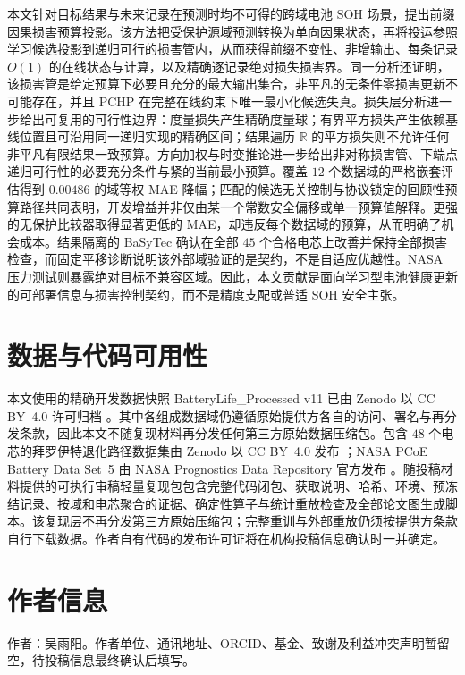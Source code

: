 \documentclass[UTF8,11pt]{ctexart}
\newcommand{\R}{\mathbb{R}}
\begin{document}
本文针对目标结果与未来记录在预测时均不可得的跨域电池 SOH 场景，提出前缀因果损害预算投影。该方法把受保护源域预测转换为单向因果状态，再将投运参照学习候选投影到递归可行的损害管内，从而获得前缀不变性、非增输出、每条记录 $O(1)$ 的在线状态与计算，以及精确逐记录绝对损失损害界。同一分析还证明，该损害管是给定预算下必要且充分的最大输出集合，非平凡的无条件零损害更新不可能存在，并且 PCHP 在完整在线约束下唯一最小化候选失真。损失层分析进一步给出可复用的可行性边界：度量损失产生精确度量球；有界平方损失产生依赖基线位置且可沿用同一递归实现的精确区间；结果遍历 $\R$ 的平方损失则不允许任何非平凡有限结果一致预算。方向加权与时变推论进一步给出非对称损害管、下端点递归可行性的必要充分条件与紧的当前最小预算。覆盖 $12$ 个数据域的严格嵌套评估得到 $0.00486$ 的域等权 MAE 降幅；匹配的候选无关控制与协议锁定的回顾性预算路径共同表明，开发增益并非仅由某一个常数安全偏移或单一预算值解释。更强的无保护比较器取得显著更低的 MAE，却违反每个数据域的预算，从而明确了机会成本。结果隔离的 BaSyTec 确认在全部 $45$ 个合格电芯上改善并保持全部损害检查，而固定平移诊断说明该外部域验证的是契约，不是自适应优越性。NASA 压力测试则暴露绝对目标不兼容区域。因此，本文贡献是面向学习型电池健康更新的可部署信息与损害控制契约，而不是精度支配或普适 SOH 安全主张。

\section*{数据与代码可用性}

本文使用的精确开发数据快照 BatteryLife\_Processed v11 已由 Zenodo 以 CC BY~4.0 许可归档 \citep{batterylife2026processed}。其中各组成数据域仍遵循原始提供方各自的访问、署名与再分发条款，因此本文不随复现材料再分发任何第三方原始数据压缩包。包含 $48$ 个电芯的拜罗伊特退化路径数据集由 Zenodo 以 CC BY~4.0 发布 \citep{roder2025degradationdata}；NASA PCoE Battery Data Set~5 由 NASA Prognostics Data Repository 官方发布 \citep{saha2007nasa}。随投稿材料提供的可执行审稿轻量复现包包含完整代码闭包、获取说明、哈希、环境、预冻结记录、按域和电芯聚合的证据、确定性算子与统计重放检查及全部论文图生成脚本。该复现层不再分发第三方原始压缩包；完整重训与外部重放仍须按提供方条款自行下载数据。作者自有代码的发布许可证将在机构投稿信息确认时一并确定。

\section*{作者信息}

作者：吴雨阳。作者单位、通讯地址、ORCID、基金、致谢及利益冲突声明暂留空，待投稿信息最终确认后填写。



\end{document}
